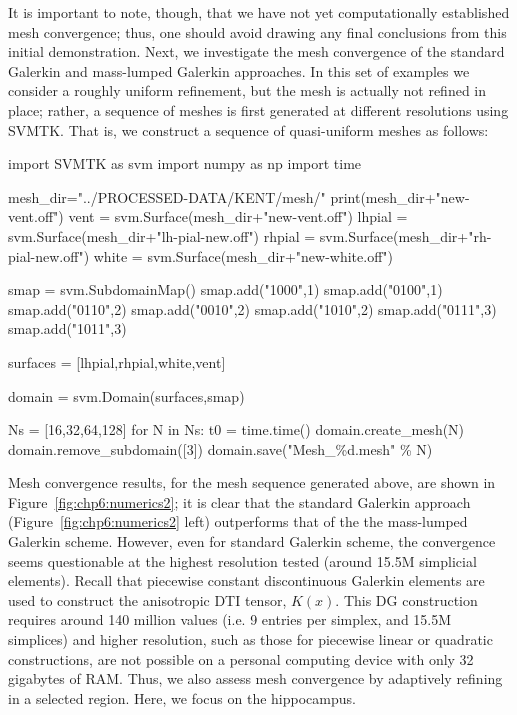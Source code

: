 It is important to note, though, that we have not yet computationally 
established mesh convergence; thus, one should avoid drawing any final conclusions 
from this initial demonstration.  Next, we investigate the mesh convergence of 
the standard Galerkin and mass-lumped Galerkin approaches.  In this set of examples 
we consider a roughly uniform refinement, but the mesh is actually not refined in 
place; rather, a sequence of meshes is first generated at different resolutions 
using SVMTK. That is, we construct a sequence of quasi-uniform meshes as follows: 
\begin{python}
import SVMTK as svm
import numpy as np
import time

mesh_dir="../PROCESSED-DATA/KENT/mesh/"
print(mesh_dir+"new-vent.off") 
vent  = svm.Surface(mesh_dir+"new-vent.off") 
lhpial = svm.Surface(mesh_dir+"lh-pial-new.off") 
rhpial = svm.Surface(mesh_dir+"rh-pial-new.off") 
white  = svm.Surface(mesh_dir+"new-white.off") 

smap = svm.SubdomainMap() 
smap.add("1000",1)
smap.add("0100",1) 
smap.add("0110",2)
smap.add("0010",2)
smap.add("1010",2)
smap.add("0111",3)
smap.add("1011",3)

surfaces = [lhpial,rhpial,white,vent] 

domain = svm.Domain(surfaces,smap)

Ns = [16,32,64,128]
for N in Ns: 
    t0 = time.time()
    domain.create_mesh(N) 
    domain.remove_subdomain([3]) 
    domain.save("Mesh_\%d.mesh" \% N)
\end{python}
Mesh convergence results, for the mesh sequence generated above, are shown in 
Figure~\ref{fig:chp6:numerics2}; it is clear that the standard Galerkin approach 
(Figure~\ref{fig:chp6:numerics2} left) outperforms that of the the mass-lumped 
Galerkin scheme.   However, even for standard Galerkin scheme, the convergence 
seems questionable at the highest resolution tested (around 15.5M simplicial 
elements).  Recall that piecewise constant discontinuous Galerkin elements are 
used to construct the anisotropic DTI tensor, $K(x)$.  This DG construction 
requires around 140 million values (i.e. 9 entries per simplex, and 15.5M 
simplices) and higher resolution, such as those for piecewise linear or 
quadratic constructions, are not possible on a personal computing device with 
only 32 gigabytes of RAM.  Thus, we also assess mesh convergence by adaptively 
refining in a selected region.  Here, we focus on the hippocampus. 

